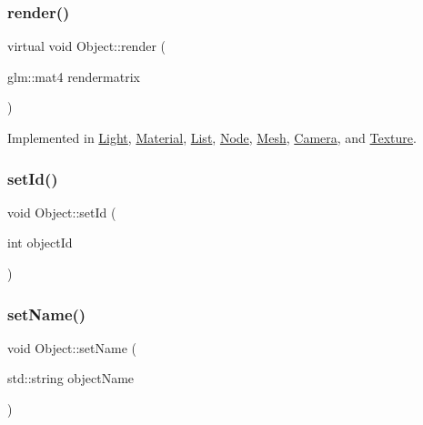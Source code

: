 \subsubsection{\texorpdfstring{render()}{render()}}
{\footnotesize\ttfamily virtual void Object\+::render (\begin{DoxyParamCaption}\item[{glm\+::mat4}]{rendermatrix }\end{DoxyParamCaption})\hspace{0.3cm}{\ttfamily [pure virtual]}}



Implemented in \hyperlink{classLight_a069c6888b42eca238328d79b03c3a411}{Light}, \hyperlink{classMaterial_ada83b9344f974994cd495b8ecda8b049}{Material}, \hyperlink{classList_a98b7c18a8ee26e9e521ab3b8f8bb4334}{List}, \hyperlink{classNode_a7faebb78a04b6421dbf5afe998f7658d}{Node}, \hyperlink{classMesh_a4d69d0cadc7f4c10d7b30b19ee1220cc}{Mesh}, \hyperlink{classCamera_adb0f3d1a0119a86ca7d68e54468b8eef}{Camera}, and \hyperlink{classTexture_a2771beaa1d538acddacc48d53bc75bdf}{Texture}.

\mbox{\label{classObject_a7ab65dbfd0a7c93266d3303330718be4}} 
\subsubsection{\texorpdfstring{set\+Id()}{setId()}}
{\footnotesize\ttfamily void Object\+::set\+Id (\begin{DoxyParamCaption}\item[{int}]{object\+Id }\end{DoxyParamCaption})\hspace{0.3cm}{\ttfamily [inline]}}

\mbox{\label{classObject_a93052cbcc55dd5ca96d87f45a2af893f}} 
\subsubsection{\texorpdfstring{set\+Name()}{setName()}}
{\footnotesize\ttfamily void Object\+::set\+Name (\begin{DoxyParamCaption}\item[{std\+::string}]{object\+Name }\end{DoxyParamCaption})\hspace{0.3cm}{\ttfamily [inline]}}

